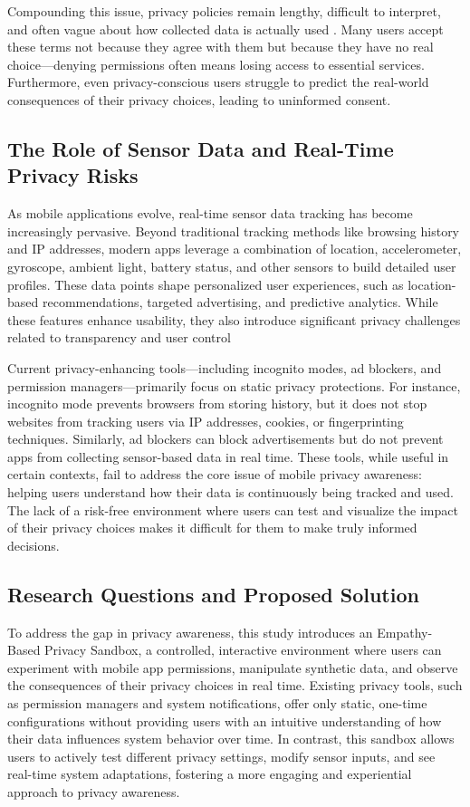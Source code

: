\documentclass[acmlarge, nonacm]{acmart}
\begin{document}
Compounding this issue, privacy policies remain lengthy, difficult to interpret, and often vague about how collected data is actually used \cite{ObarandOeldorf-Hirsch2020}. Many users accept these terms not because they agree with them but because they have no real choice—denying permissions often means losing access to essential services. Furthermore, even privacy-conscious users struggle to predict the real-world consequences of their privacy choices, leading to uninformed consent.

\subsection{The Role of Sensor Data and Real-Time Privacy Risks}

As mobile applications evolve, real-time sensor data tracking has become increasingly pervasive. Beyond traditional tracking methods like browsing history and IP addresses, modern apps leverage a combination of location, accelerometer, gyroscope, ambient light, battery status, and other sensors to build detailed user profiles. These data points shape personalized user experiences, such as location-based recommendations, targeted advertising, and predictive analytics. While these features enhance usability, they also introduce significant privacy challenges related to transparency and user control \cite{rathi2025predictive}

Current privacy-enhancing tools—including incognito modes, ad blockers, and permission managers—primarily focus on static privacy protections. For instance, incognito mode prevents browsers from storing history, but it does not stop websites from tracking users via IP addresses, cookies, or fingerprinting techniques. Similarly, ad blockers can block advertisements but do not prevent apps from collecting sensor-based data in real time. These tools, while useful in certain contexts, fail to address the core issue of mobile privacy awareness: helping users understand how their data is continuously being tracked and used. The lack of a risk-free environment where users can test and visualize the impact of their privacy choices makes it difficult for them to make truly informed decisions.

\subsection{Research Questions and Proposed Solution}

To address the gap in privacy awareness, this study introduces an Empathy-Based Privacy Sandbox, a controlled, interactive environment where users can experiment with mobile app permissions, manipulate synthetic data, and observe the consequences of their privacy choices in real time. Existing privacy tools, such as permission managers and system notifications, offer only static, one-time configurations without providing users with an intuitive understanding of how their data influences system behavior over time. In contrast, this sandbox allows users to actively test different privacy settings, modify sensor inputs, and see real-time system adaptations, fostering a more engaging and experiential approach to privacy awareness.
\end{document}
